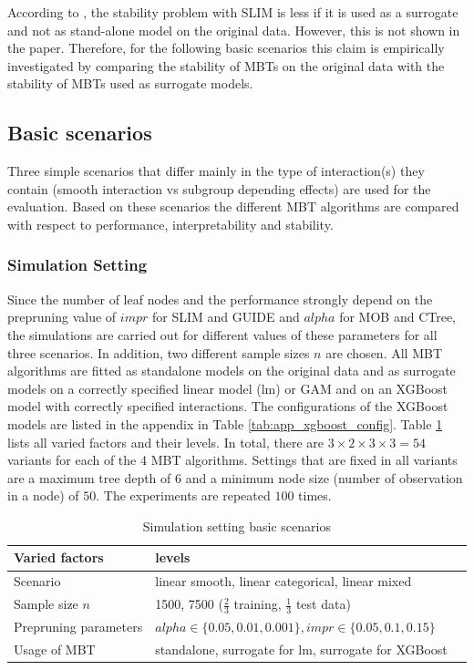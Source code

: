 According to \citep{Hu.2020}, the stability problem with SLIM is less if it is used as a surrogate and not as stand-alone model on the original data. However, this is not shown in the paper. Therefore, for the following basic scenarios this claim is empirically investigated by comparing the stability of MBTs on the original data with the stability of MBTs used as surrogate models.





\subsection{Basic scenarios}
Three simple scenarios that differ mainly in the type of interaction(s) they contain (smooth interaction vs subgroup depending effects) are used for the evaluation. Based on these scenarios the different MBT algorithms are compared with respect to performance, interpretability and stability.



\subsubsection{Simulation Setting}
Since the number of leaf nodes and the performance strongly depend on the prepruning value of $impr$ for SLIM and GUIDE and $alpha$ for MOB and CTree, the simulations are carried out for different values of these parameters for all three scenarios. In addition, two different sample sizes $n$ are chosen. 
All MBT algorithms are fitted as standalone models on the original data and as surrogate models on a correctly specified linear model (lm) or GAM and on an XGBoost model with correctly specified interactions. The configurations of the XGBoost models are listed in the appendix in Table \ref{tab:app_xgboost_config}.
Table \ref{tab:simulation_setting} lists all varied factors and their levels. In total, there are $3 \times 2 \times 3 \times 3 = 54$ variants for each of the 4 MBT algorithms.
Settings that are fixed in all variants are a  maximum tree depth of $6$ and a minimum node size (number of observation in a node) of $50$.
The experiments are repeated $100$ times.

\begin{table}[!htb] 
\centering \small
\begin{tabular}[t]{lll}
\hline
Varied factors & levels \\
\hline
Scenario  & linear smooth, linear categorical, linear mixed\\
Sample size $n$  & 1500, 7500 ($\frac{2}{3}$  training, $\frac{1}{3}$ test data)\\
Prepruning parameters   & $alpha \in \{0.05,0.01,0.001\}, impr \in \{0.05,0.1,0.15\}$ \\
Usage of MBT  & standalone, surrogate for lm, surrogate for XGBoost \\ 
\hline
\end{tabular}
\caption{Simulation setting basic scenarios}
\label{tab:simulation_setting}
\end{table}

